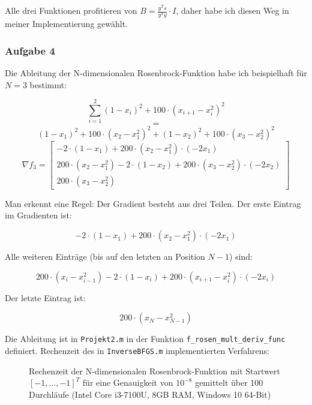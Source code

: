 \documentclass[a4paper, 12pt]{report}
\begin{document}
Alle drei Funktionen profitieren von $B = \frac{y^Ts}{y^Ty}\cdot I$, daher habe ich diesen Weg in meiner Implementierung gewählt.

\subsubsection{Aufgabe 4}

Die Ableitung der N-dimensionalen Rosenbrock-Funktion habe ich beispielhaft für $N=3$ bestimmt:

  $$\sum_{i=1}^2 (1 - x_i)^2 + 100\cdot(x_{i+1} - x_i^2)^2$$
  $$=$$
  $$(1 - x_1)^2 + 100\cdot (x_2 - x_1^2)^2 + (1 - x_2)^2 + 100\cdot(x_3 - x_2^2)^2$$
  $$\nabla f_3 = \begin{bmatrix}-2\cdot(1 - x_1) + 200\cdot(x_2 - x_1^2)\cdot(-2x_1)\\
    200\cdot(x_2 - x_1^2) - 2\cdot(1 - x_2) + 200\cdot(x_3 - x_2^2)\cdot(-2x_2)\\
    200\cdot(x_3 - x_2^2)\end{bmatrix}$$

Man erkennt eine Regel: Der Gradient besteht aus drei Teilen. Der erste Eintrag im Gradienten ist:

$$-2\cdot(1 - x_1) + 200\cdot(x_2 - x_1^2)\cdot(-2x_1)$$

Alle weiteren Einträge (bis auf den letzten an Position $N-1$) sind:

$$200\cdot(x_i - x_{i-1}^2) - 2\cdot(1 - x_i) + 200\cdot(x_{i+1} - x_i^2)\cdot(-2x_i)$$

Der letzte Eintrag ist:

$$200\cdot(x_N - x_{N-1}^2)$$

Die Ableitung ist in \lstinline[basicstyle=\ttfamily\color{black}]|Projekt2.m| in der Funktion
\lstinline[basicstyle=\ttfamily\color{black}]|f_rosen_mult_deriv_func| definiert.
Rechenzeit des in \lstinline[basicstyle=\ttfamily\color{black}]|InverseBFGS.m| implementierten Verfahrens:

\begin{figure}[H]
  \centering
\caption{Rechenzeit der N-dimensionalen Rosenbrock-Funktion mit Startwert $[-1, \ldots, -1]^T$ für
  eine Genauigkeit von $10^{-8}$ gemittelt über 100 Durchläufe (Intel Core i3-7100U, 8GB RAM, Windows 10 64-Bit)}
\end{figure}
\end{document}
